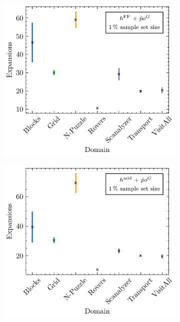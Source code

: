 \documentclass[ppgc,diss,english]{iiufrgs}
\begin{document}
\begin{figure}[tb]
  \caption[Standard deviation of expansions using logic-based heuristics with \pog]{Mean number of expansions and its standard deviation per domain for GBFS guided by different logic-based heuristics and \pog trained on a $1\,\%$ sample set size.}
  \centering
  \vspace{\baselineskip}
  \begin{subfigure}{0.41\textwidth}
    \centering
    \includegraphics[width=\linewidth]{img/error_hFF_poG_1pct.pdf}
  \end{subfigure}
  \begin{subfigure}{0.41\textwidth}
    \centering
    \includegraphics[width=\linewidth]{img/error_hADD_poG_1pct.pdf}
  \end{subfigure}


\end{figure}
\end{document}
